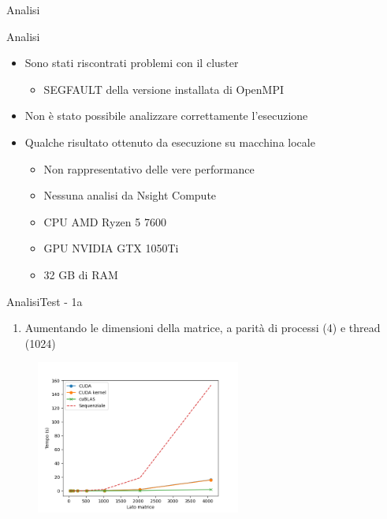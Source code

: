 \begin{frame}
    \centering \Huge
    Analisi
\end{frame}

\begin{frame}{Analisi}
    \begin{itemize}
        \item Sono stati riscontrati problemi con il cluster
              \begin{itemize}
                  \item SEGFAULT della versione installata di OpenMPI
              \end{itemize}
        \item Non è stato possibile analizzare correttamente l'esecuzione
        \item Qualche risultato ottenuto da esecuzione su macchina locale
              \begin{itemize}
                  \item Non rappresentativo delle vere performance
                  \item Nessuna analisi da Nsight Compute

                  \item CPU AMD Ryzen 5 7600
                  \item GPU NVIDIA GTX 1050Ti
                  \item 32 GB di RAM
              \end{itemize}
    \end{itemize}
\end{frame}

\begin{frame}{Analisi}{Test - 1a}
    \begin{enumerate}
        \item[1a] Aumentando le dimensioni della matrice, a parità di processi (4) e thread (1024)
    \end{enumerate}

    \begin{figure}[H]
        \centering
        \includegraphics[width=0.6\textwidth]{./imgs/graphs/caso_0.png}
    \end{figure}
\end{frame}


